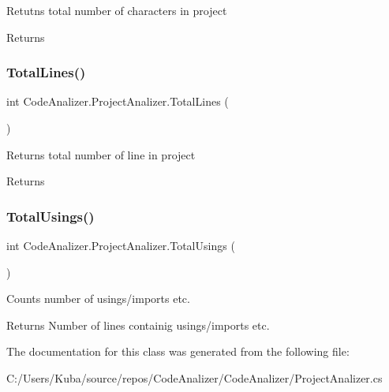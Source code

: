 Retutns total number of characters in project 

\begin{DoxyReturn}{Returns}

\end{DoxyReturn}
\mbox{\label{class_code_analizer_1_1_project_analizer_aad0869b232a62de023d48dda1edb9766}} 
\subsubsection{\texorpdfstring{Total\+Lines()}{TotalLines()}}
{\footnotesize\ttfamily int Code\+Analizer.\+Project\+Analizer.\+Total\+Lines (\begin{DoxyParamCaption}{ }\end{DoxyParamCaption})}



Returns total number of line in project 

\begin{DoxyReturn}{Returns}

\end{DoxyReturn}
\mbox{\label{class_code_analizer_1_1_project_analizer_a6b4d14436cbf5a7bdfe24870fe2209d7}} 
\subsubsection{\texorpdfstring{Total\+Usings()}{TotalUsings()}}
{\footnotesize\ttfamily int Code\+Analizer.\+Project\+Analizer.\+Total\+Usings (\begin{DoxyParamCaption}{ }\end{DoxyParamCaption})}



Counts number of usings/imports etc. 

\begin{DoxyReturn}{Returns}
Number of lines containig usings/imports etc.
\end{DoxyReturn}


The documentation for this class was generated from the following file\+:\begin{DoxyCompactItemize}
\item 
C\+:/\+Users/\+Kuba/source/repos/\+Code\+Analizer/\+Code\+Analizer/Project\+Analizer.\+cs\end{DoxyCompactItemize}
